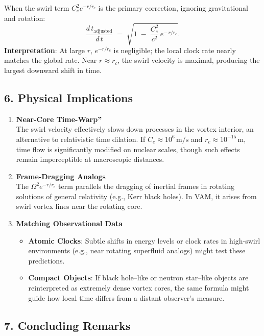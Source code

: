 \documentclass[a4paper,12pt]{article}
\begin{document}
When the swirl term \(C_e^2 e^{-r/r_c}\) is the primary correction, ignoring gravitational and rotation:
\[
    \frac{d\,t_\text{adjusted}}{d\,t}
    \;=\;
    \sqrt{
        1
        \;-\;
        \frac{C_e^2}{c^2}\, e^{-\,r/r_c}
    }.
\]
\textbf{Interpretation}: At large \(r\), \(e^{-r/r_c}\) is negligible; the local clock rate nearly matches the global rate. Near \(r\approx r_c\), the swirl velocity is maximal, producing the largest downward shift in time.

\subsection*{6. Physical Implications}

\begin{enumerate}
    \item \textbf{Near-Core \grqq Time-Warp\textquotedblright} \\
    The swirl velocity effectively slows down processes in the vortex interior, an alternative to relativistic time dilation. If \(C_e\approx 10^6\,\text{m/s}\) and \(r_c\approx 10^{-15}\,\text{m}\), time flow is significantly modified on nuclear scales, though such effects remain imperceptible at macroscopic distances.
    \item \textbf{Frame-Dragging Analogs} \\
    The \(\Omega^2 e^{-r/r_c}\) term parallels the dragging of inertial frames in rotating solutions of general relativity (e.g., Kerr black holes). In VAM, it arises from swirl vortex lines near the rotating core.
    \item \textbf{Matching Observational Data} \\
    \begin{itemize}
        \item \textbf{Atomic Clocks}: Subtle shifts in energy levels or clock rates in high-swirl environments (e.g., near rotating superfluid analogs) might test these predictions.
        \item \textbf{Compact Objects}: If black hole–like or neutron star–like objects are reinterpreted as extremely dense vortex cores, the same formula might guide how local time differs from a distant observer's measure.
    \end{itemize}
\end{enumerate}

\subsection*{7. Concluding Remarks}
\end{document}
